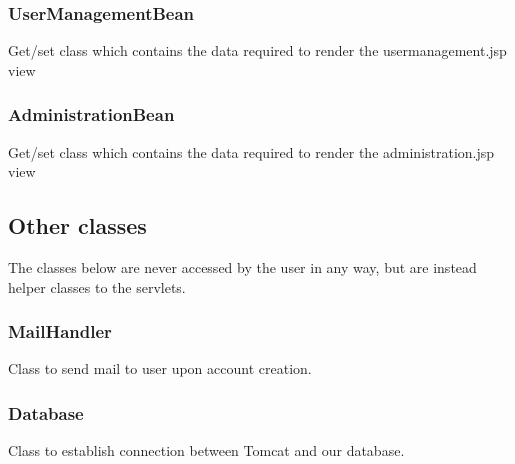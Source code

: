 \documentclass{article}
\begin{document}
\subsubsection{UserManagementBean}
Get/set class which contains the data required to render the usermanagement.jsp view

\subsubsection{AdministrationBean}
Get/set class which contains the data required to render the administration.jsp view

\subsection{Other classes}
The classes below are never accessed by the user in any way, but are instead helper classes to the servlets.

\subsubsection{MailHandler}
Class to send mail to user upon account creation.

\subsubsection{Database}
Class to establish connection between Tomcat and our database.

\end{document}
